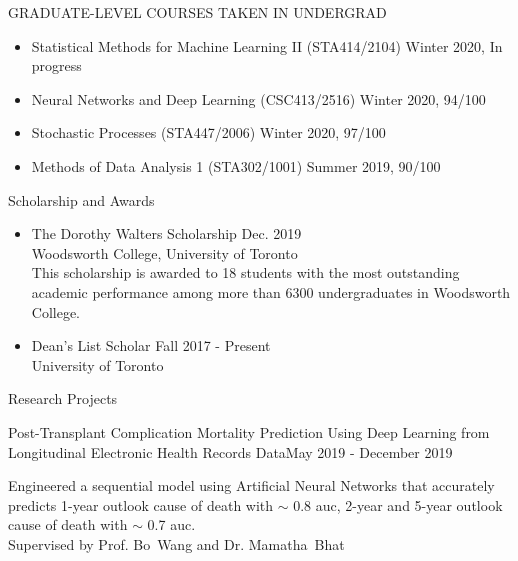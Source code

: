 \documentclass{resume} %
\newcommand{\tab}[1]{\hspace{.2667\textwidth}\rlap{#1}}
\newcommand{\itab}[1]{\hspace{0em}\rlap{#1}}
\begin{document}
\begin{rSection}{GRADUATE-LEVEL COURSES TAKEN IN UNDERGRAD}
\begin{itemize}
	\item Statistical Methods for Machine Learning II (STA414/2104) \hfill{Winter 2020, In progress}
	\item Neural Networks and Deep Learning (CSC413/2516) \hfill{Winter 2020, 94/100}
	\item Stochastic Processes (STA447/2006) \hfill{Winter 2020, 97/100}
	\item Methods of Data Analysis 1 (STA302/1001) \hfill{Summer 2019, 90/100}
\end{itemize}
\end{rSection}

\begin{rSection}{Scholarship and Awards}
\begin{itemize}
	\item The Dorothy Walters Scholarship \hfill{Dec. 2019}\\
	Woodsworth College, University of Toronto\\
	This scholarship is awarded to 18 students with the most outstanding academic performance among more than 6300 undergraduates in Woodsworth College.
	\item Dean's List Scholar \hfill{Fall 2017 - Present}\\
	University of Toronto
\end{itemize}
\end{rSection}


\begin{rSection}{Research Projects}
	\begin{rSubsection}{Post-Transplant Complication Mortality Prediction Using Deep Learning from Longitudinal Electronic Health Records Data}{May 2019 - December 2019}{}{}
		\item
		Engineered a sequential model using Artificial Neural Networks that accurately predicts 1-year outlook cause of death with $\sim$ 0.8 auc, 2-year and 5-year outlook cause of death with $\sim$ 0.7 auc. \\
		Supervised by Prof. Bo~Wang and Dr. Mamatha~Bhat
	\end{rSubsection}
\end{rSection}
\end{document}
